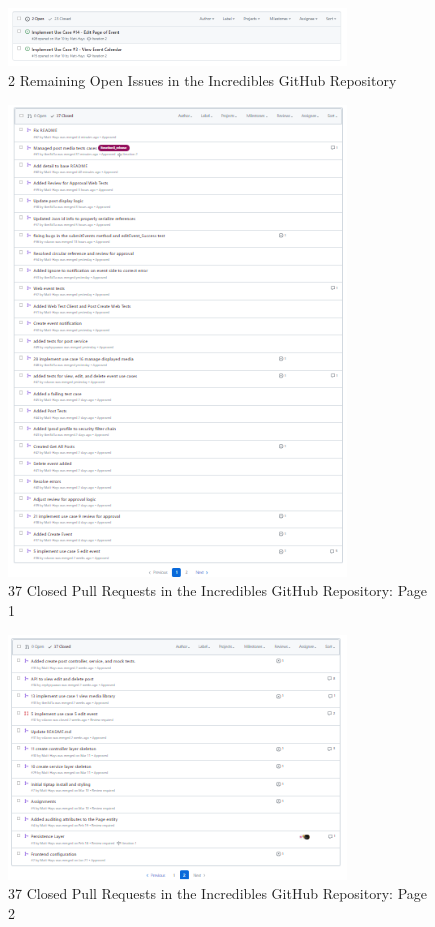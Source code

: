 \begin{figure}[H]
    \centering
    \includegraphics[width=0.8\textwidth]{images/OpenIssues.png}
    \centering
    \caption{2 Remaining Open Issues in the Incredibles GitHub Repository}
\end{figure}

\begin{figure}[H]
    \centering
    \includegraphics[width=0.8\textwidth]{images/PullRequests1.png}
    \centering
    \caption{37 Closed Pull Requests in the Incredibles GitHub Repository: Page 1}
\end{figure}

\begin{figure}[H]
    \centering
    \includegraphics[width=0.8\textwidth]{images/PullRequests2.png}
    \centering
    \caption{37 Closed Pull Requests in the Incredibles GitHub Repository: Page 2}
\end{figure}

